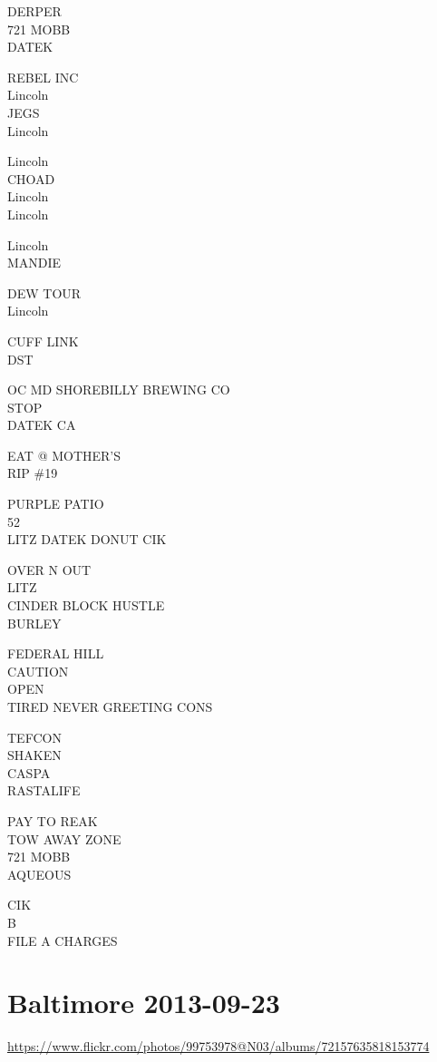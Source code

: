 \documentclass[10pt,letterpaper]{article}
\begin{document}
DERPER\\
721 MOBB\\
DATEK

REBEL INC\\
Lincoln\\
JEGS\\
Lincoln

Lincoln\\
CHOAD\\
Lincoln\\
Lincoln

Lincoln\\
MANDIE

DEW TOUR\\
Lincoln

CUFF LINK\\
DST

OC MD SHOREBILLY BREWING CO\\
STOP\\
DATEK CA

EAT @ MOTHER'S\\
RIP \#19

PURPLE PATIO\\
52\\
LITZ DATEK DONUT CIK

OVER N OUT\\
LITZ\\
CINDER BLOCK HUSTLE\\
BURLEY

FEDERAL HILL\\
CAUTION\\
OPEN\\
TIRED NEVER GREETING CONS

TEFCON\\
SHAKEN\\
CASPA\\
RASTALIFE

PAY TO REAK\\
TOW AWAY ZONE\\
721 MOBB\\
AQUEOUS

CIK\\
B\\
FILE A CHARGES
\

\section*{Baltimore 2013-09-23}

\url{https://www.flickr.com/photos/99753978@N03/albums/72157635818153774}
\end{document}
